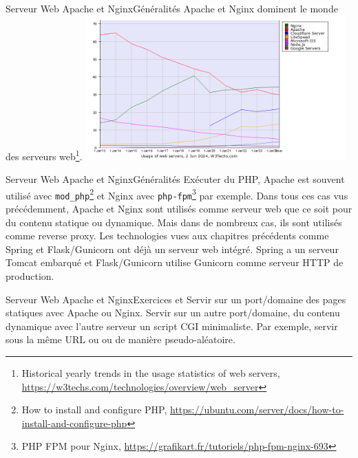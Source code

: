 \documentclass{beamer}
\begin{document}
    \begin{frame}{Serveur Web Apache et Nginx}{Généralités}
        Apache et Nginx dominent le monde des serveurs web\footnote{Historical yearly trends in the usage statistics of web servers, \url{https://w3techs.com/technologies/overview/web_server}}.
        \bigbreak
        \centering
        \includegraphics[width=10cm]{image/web-server-stats}
    \end{frame}

    \begin{frame}{Serveur Web Apache et Nginx}{Généralités}
        Exécuter du PHP, Apache est souvent utilisé avec \lstinline{mod_php}\footnote{How to install and configure PHP, \url{https://ubuntu.com/server/docs/how-to-install-and-configure-php}} et Nginx avec \lstinline{php-fpm}\footnote{PHP FPM pour Nginx, \url{https://grafikart.fr/tutoriels/php-fpm-nginx-693}} par exemple.
        \bigbreak
        Dans tous ces cas vus précédemment, Apache et Nginx sont utilisés comme serveur web que ce soit pour du contenu statique ou dynamique.
        \bigbreak
        Mais dans de nombreux cas, ils sont utilisés comme reverse proxy.
        Les technologies vues aux chapitres précédents comme Spring et Flask/Gunicorn ont déjà un serveur web intégré.
        Spring a un serveur Tomcat embarqué et Flask/Gunicorn utilise Gunicorn comme serveur HTTP de production.
    \end{frame}

    \begin{frame}{Serveur Web Apache et Nginx}{Exercices \execcounterdispinc{} et \execcounterdispinc{}}
        Servir sur un port/domaine des pages statiques avec Apache ou Nginx.
        \bigbreak
        Servir sur un autre port/domaine, du contenu dynamique avec l'autre serveur un script CGI minimaliste.
        Par exemple, servir sous la même URL  ou  ou  de manière pseudo-aléatoire.
    \end{frame}
\end{document}
